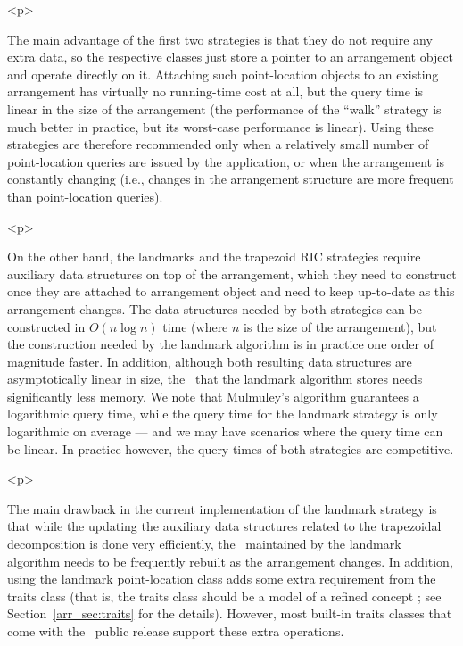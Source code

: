 \begin{ccHtmlOnly}<p>\end{ccHtmlOnly}
The main advantage of the first two strategies is that they do not
require any extra data, so the respective classes just store a
pointer to an arrangement object and operate directly on it.
Attaching such point-location objects to an existing arrangement
has virtually no running-time cost at all, but the query time is
linear in the size of the arrangement (the performance of the
``walk'' strategy is much better in practice, but its worst-case
performance is linear). Using these strategies are therefore
recommended only when a relatively small number of point-location
queries are issued by the application, or when the arrangement is
constantly changing (i.e., changes in the arrangement structure
are more frequent than point-location queries).

\begin{ccHtmlOnly}<p>\end{ccHtmlOnly}
On the other hand, the landmarks and the trapezoid RIC strategies
require auxiliary data structures on top of the arrangement, which
they need to construct once they are attached to arrangement
object and need to keep up-to-date as this arrangement changes.
The data structures needed by both strategies can be constructed
in $O(n \log n)$ time (where $n$ is the size of the arrangement),
but the construction needed by the landmark algorithm is in
practice one order of magnitude faster. In addition, although both
resulting data structures are asymptotically linear in size, the
\kdtree\ that the landmark algorithm stores needs significantly
less memory. We note that Mulmuley's algorithm guarantees a
logarithmic query time, while the query time for the landmark
strategy is only logarithmic on average --- and we may have
scenarios where the query time can be linear. In practice however,
the query times of both strategies are competitive.

\begin{ccHtmlOnly}<p>\end{ccHtmlOnly}
The main drawback in the current implementation of the landmark
strategy is that while the updating the auxiliary data structures
related to the trapezoidal decomposition is done very efficiently,
the \kdtree\ maintained by the landmark algorithm needs to be
frequently rebuilt as the arrangement changes. In addition, using
the landmark point-location class adds some extra requirement
from the traits class (that is, the traits class should be a model
of a refined concept ; see
Section~\ref{arr_sec:traits} for the details). However, most
built-in traits classes that come with the \cgal\ public release
support these extra operations.

